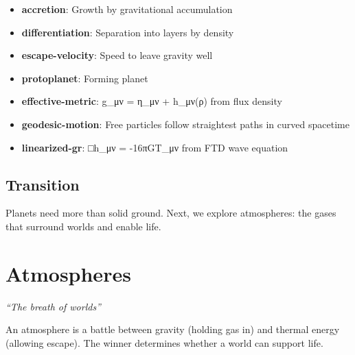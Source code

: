 \documentclass[
  11pt,
  letterpaper,
  twoside,
  openright]{book}
\providecommand{\tightlist}{%
  \setlength{\itemsep}{0pt}\setlength{\parskip}{0pt}}
\begin{document}
\begin{itemize}
\tightlist
\item
  \textbf{accretion}: Growth by gravitational accumulation
\item
  \textbf{differentiation}: Separation into layers by density
\item
  \textbf{escape-velocity}: Speed to leave gravity well
\item
  \textbf{protoplanet}: Forming planet
\item
  \textbf{effective-metric}: g\_μν = η\_μν + h\_μν(ρ) from flux density
\item
  \textbf{geodesic-motion}: Free particles follow straightest paths in
  curved spacetime
\item
  \textbf{linearized-gr}: □h\_μν = -16πGT\_μν from FTD wave equation
\end{itemize}

\section{Transition}\label{transition-15}

Planets need more than solid ground. Next, we explore atmospheres: the
gases that surround worlds and enable life.

\chapter{Atmospheres}\label{sec-atmospheres}

\emph{``The breath of worlds''}

\begin{tcolorbox}[enhanced jigsaw, coltitle=black, colbacktitle=quarto-callout-note-color!10!white, toprule=.15mm, colframe=quarto-callout-note-color-frame, arc=.35mm, opacityback=0, bottomtitle=1mm, toptitle=1mm, breakable, colback=white, titlerule=0mm, opacitybacktitle=0.6, title=\textcolor{quarto-callout-note-color}{\faInfo}\hspace{0.5em}{Key Revelation}, rightrule=.15mm, bottomrule=.15mm, leftrule=.75mm, left=2mm]

An atmosphere is a battle between gravity (holding gas in) and thermal
energy (allowing escape). The winner determines whether a world can
support life.

\end{tcolorbox}
\end{document}
